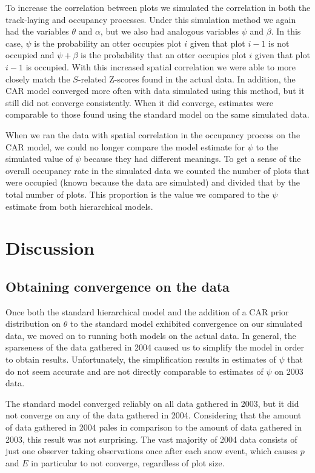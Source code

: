 \documentclass[12pt]{article}
\begin{document}
    To increase the correlation between plots we simulated the correlation
    in both the track-laying and occupancy processes. Under this
    simulation method we
    again had the variables $\theta$ and $\alpha$, but we also had analogous
    variables $ \psi$ and $\beta$. In this case, $\psi$ is the probability an
    otter occupies plot $i$ given that plot $i-1$ is not occupied and $\psi+
    \beta$ is the probability that an otter occupies plot $i$ given that plot
    $i-1$ is occupied. With this increased spatial correlation we were able to
    more closely match the $S$-related Z-scores found in the actual data. In
    addition, the CAR model converged more often with data simulated using this
    method, but it still did not converge consistently. When it did converge,
    estimates were comparable to those found using the standard model on the
    same simulated data.

    When we ran the data with spatial correlation in the occupancy process on
    the CAR model, we could no longer compare the model estimate for $\psi$ to
    the simulated value of $\psi$ because they had different meanings. To get a
    sense of the overall occupancy rate in the simulated data we counted the
    number of plots that were occupied (known because the data are simulated)
    and divided that by the total number of plots. This proportion is the value
    we compared to the $\psi$ estimate from both hierarchical models.

\section{Discussion}

    \subsection{Obtaining convergence on the data}
    Once both the standard hierarchical model and the addition of a CAR prior
    distribution on \(\theta\) to the standard model exhibited convergence on
    our simulated data, we moved on to running both models on the actual data.
    In general, the sparseness of the data gathered in 2004 caused us to
    simplify the model in order to obtain results. Unfortunately, the
    simplification results in estimates of \(\psi\) that do not seem accurate
    and are not directly comparable to estimates of \(\psi\) on 2003 data.

    The standard model converged reliably on all data gathered in 2003, but it
    did not converge on any of the data gathered in 2004. Considering that the
    amount of data gathered in 2004 pales in comparison to the amount of data
    gathered in 2003, this result was not surprising. The vast majority of
    2004 data consists of just one observer taking observations once after
    each snow event, which causes \(p\) and \(E\) in particular to not converge,
    regardless of plot size.
\end{document}
